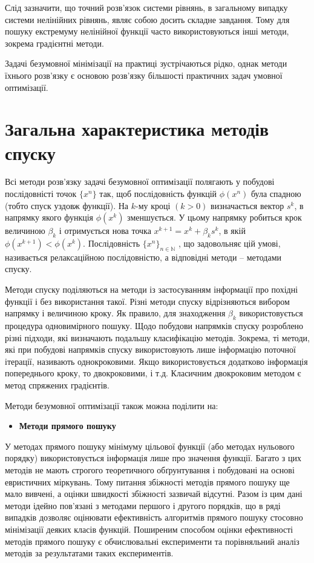 Слід зазначити, що точний розв’язок системи рівнянь, в загальному випадку системи нелінійних рівнянь, являє собою досить складне завдання. Тому для пошуку екстремуму нелінійної функції часто використовуються інші методи, зокрема градієнтні методи.

Задачі безумовної мінімізації на практиці зустрічаються рідко, однак методи їхнього розв’язку є основою розв’язку більшості практичних задач умовної оптимізації.

\section {Загальна характеристика методів спуску}

Всі методи розв'язку задачі безумовної оптимізації полягають у побудові послідовністі точок $\{x^n\}$ так, щоб послідовність функцій $\phi(x^n)$ була спадною (тобто спуск уздовж функції). На $k$-му кроці $(k > 0)$ визначається вектор $s^k$, в напрямку якого функція $\phi(x^k)$ зменшується. У цьому напрямку робиться крок величиною $\beta_k$ і отримується нова точка
$x^{k+1} = x^k + \beta_ks^k$, в якій $\phi(x^{k+1}) < \phi(x^k)$. Послідовність $\{x^n\}_{n \in \mathbb{N}}$ , що задовольняє цій умові, називається релаксаційною послідовністю, а відповідні методи – методами спуску.

 Методи спуску поділяються на методи із застосуванням інформації про похідні функції і без використання такої. Різні методи спуску відрізняються вибором напрямку і величиною кроку. Як правило, для знаходження $\beta_k$ використовується процедура одновимірного пошуку. Щодо побудови напрямків спуску розроблено різні підходи, які визначають подальшу класифікацію методів. Зокрема, ті методи, які при побудові напрямків спуску використовують лише інформацію поточної ітерації, називають однокроковими. Якщо використовується додатково інформація попереднього кроку, то двокроковими, і т.д. Класичним двокроковим методом є метод спряжених градієнтів.

\newpage
Методи безумовної оптимізації також можна поділити на:
\begin{itemize}
	\item \textbf{Методи прямого пошуку}
\end{itemize}

	У методах прямого пошуку мінімуму цільової функції (або методах нульового порядку) використовується інформація лише про значення функції. Багато з цих методів не мають строгого теоретичного обґрунтування і побудовані на основі евристичних міркувань. Тому питання збіжності методів прямого пошуку ще мало вивчені, а оцінки швидкості збіжності зазвичай відсутні. Разом із цим дані методи ідейно пов'язані з методами першого і другого порядків, що в ряді випадків дозволяє оцінювати ефективність алгоритмів прямого пошуку стосовно мінімізації деяких класів функцій. Поширеним способом оцінки ефективності методів прямого пошуку є обчислювальні експерименти та порівняльний аналіз методів за результатами таких експериментів.
	
